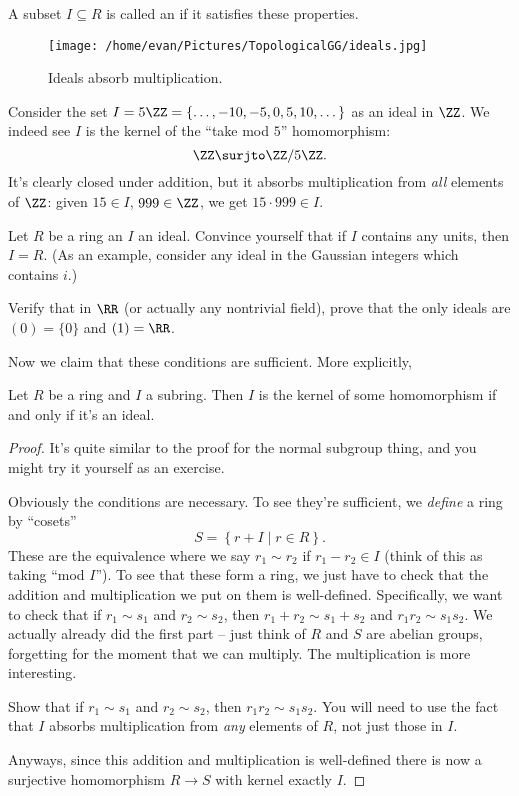 A subset $I \subseteq R$ is called an  if it satisfies these properties.
\begin{figure}[ht]
	\centering
	\texttt{[image: /home/evan/Pictures/TopologicalGG/ideals.jpg]}
	\caption{Ideals absorb multiplication.}
\end{figure}

\begin{example}
	Consider the set $I = 5\ZZ = \{\dots,-10,-5,0,5,10,\dots\}$ as an ideal in $\ZZ$.
	We indeed see $I$ is the kernel of the ``take mod $5$'' homomorphism:
	\[ \ZZ \surjto \ZZ/5\ZZ. \]
	It's clearly closed under addition,
	but it absorbs multiplication from \emph{all} elements of $\ZZ$:
	given $15 \in I$, $999 \in \ZZ$, we get $15 \cdot 999 \in I$.
\end{example}

\begin{ques}
	Let $R$ be a ring an $I$ an ideal.
	Convince yourself that if $I$ contains any units, then $I = R$.
	(As an example, consider any ideal in the Gaussian integers
	which contains $i$.)
\end{ques}
\begin{ques}
	Verify that in $\RR$ (or actually any nontrivial field),
	prove that the only ideals are $(0) = \{0\}$ and $(1) = \RR$.
\end{ques}

Now we claim that these conditions are sufficient.
More explicitly,
\begin{theorem}
	Let $R$ be a ring and $I$ a subring.
	Then $I$ is the kernel of some homomorphism if and only if it's an ideal.
\end{theorem}
\begin{proof}
	It's quite similar to the proof for the normal subgroup thing,
	and you might try it yourself as an exercise.
	
	Obviously the conditions are necessary.
	To see they're sufficient, we \emph{define} a ring by ``cosets''
	\[ S = \left\{ r + I \mid r \in R \right\}. \]
	These are the equivalence where we say $r_1 \sim r_2$ if $r_1 - r_2 \in I$
	(think of this as taking ``mod $I$'').
	To see that these form a ring, we just have to check that the addition
	and multiplication we put on them is well-defined.
	Specifically, we want to check that if $r_1 \sim s_1$ and $r_2 \sim s_2$,
	then $r_1 + r_2 \sim s_1 + s_2$ and $r_1r_2 \sim s_1s_2$.
	We actually already did the first part -- just think of $R$ and $S$ are abelian
	groups, forgetting for the moment that we can multiply.
	The multiplication is more interesting.
	\begin{exercise}
		[Recommended]
		Show that if $r_1 \sim s_1$ and $r_2 \sim s_2$, then $r_1r_2 \sim s_1s_2$.
		You will need to use the fact that $I$ absorbs multiplication
		from \emph{any} elements of $R$, not just those in $I$.
	\end{exercise}
	Anyways, since this addition and multiplication is well-defined there
	is now a surjective homomorphism $R \to S$ with kernel exactly $I$.
\end{proof}

